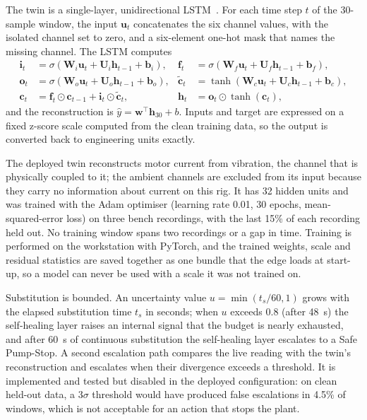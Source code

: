 The twin is a single-layer, unidirectional LSTM~\cite{hochreiter1997lstm}. For each time step $t$ of the 30-sample window, the input $\mathbf{u}_t$ concatenates the six channel values, with the isolated channel set to zero, and a six-element one-hot mask that names the missing channel. The LSTM computes
\begin{align}
\mathbf{i}_t &= \sigma(\mathbf{W}_i \mathbf{u}_t + \mathbf{U}_i \mathbf{h}_{t-1} + \mathbf{b}_i), &
\mathbf{f}_t &= \sigma(\mathbf{W}_f \mathbf{u}_t + \mathbf{U}_f \mathbf{h}_{t-1} + \mathbf{b}_f), \nonumber\\
\mathbf{o}_t &= \sigma(\mathbf{W}_o \mathbf{u}_t + \mathbf{U}_o \mathbf{h}_{t-1} + \mathbf{b}_o), &
\tilde{\mathbf{c}}_t &= \tanh(\mathbf{W}_c \mathbf{u}_t + \mathbf{U}_c \mathbf{h}_{t-1} + \mathbf{b}_c), \nonumber\\
\mathbf{c}_t &= \mathbf{f}_t \odot \mathbf{c}_{t-1} + \mathbf{i}_t \odot \tilde{\mathbf{c}}_t, &
\mathbf{h}_t &= \mathbf{o}_t \odot \tanh(\mathbf{c}_t),
\end{align}
and the reconstruction is $\hat{y} = \mathbf{w}^{\top} \mathbf{h}_{30} + b$. Inputs and target are expressed on a fixed z-score scale computed from the clean training data, so the output is converted back to engineering units exactly.

The deployed twin reconstructs motor current from vibration, the channel that is physically coupled to it; the ambient channels are excluded from its input because they carry no information about current on this rig. It has 32 hidden units and was trained with the Adam optimiser (learning rate 0.01, 30 epochs, mean-squared-error loss) on three bench recordings, with the last 15\% of each recording held out. No training window spans two recordings or a gap in time. Training is performed on the workstation with PyTorch, and the trained weights, scale and residual statistics are saved together as one bundle that the edge loads at start-up, so a model can never be used with a scale it was not trained on.

Substitution is bounded. An uncertainty value $u = \min(t_s/60, 1)$ grows with the elapsed substitution time $t_s$ in seconds; when $u$ exceeds 0.8 (after 48~s) the self-healing layer raises an internal signal that the budget is nearly exhausted, and after 60~s of continuous substitution the self-healing layer escalates to a Safe Pump-Stop. A second escalation path compares the live reading with the twin's reconstruction and escalates when their divergence exceeds a threshold. It is implemented and tested but disabled in the deployed configuration: on clean held-out data, a 3$\sigma$ threshold would have produced false escalations in 4.5\% of windows, which is not acceptable for an action that stops the plant.

